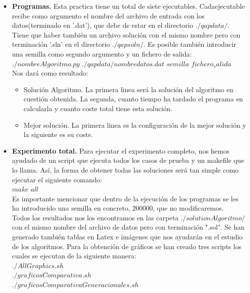 \begin{itemize}
	\item \textbf{Programas.} Esta practica tiene un total de siete ejecutables. Cadaejecutable recibe como argumento el nombre del archivo de entrada con los datos(terminado en '.dat'), que debe de estar en el directorio $./qapdata/$. Tiene que haber también un archivo solución con el mismo nombre pero con terminación '.sln'  en el directorio $./qapsoln/$. Es posible también introducir una semilla como segundo argumento y un fichero de salida:\\
	
	$./nombreAlgoritmo.py$ $./qapdata/nombredatos.dat$ $semilla$ $fichero_salida$\\
	
	Nos dará como resultado:\\
	\begin{itemize}
		\item Solución Algoritmo. La primera linea será la solución del algoritmo en cuestión obtenida. La segunda, cuanto tiempo ha tardado el programa en calcularla y cuanto coste total tiene esta solución.
		\item Mejor solución. La primera linea es la configuración de la mejor solución y la siguiente es su coste.
	\end{itemize}
	
	\item \textbf{Experimento total.} Para ejecutar el experimento completo, nos hemos ayudado de un script que ejecuta todos los casos de prueba y un makefile que lo llama. Así, la forma de obtener todas las soluciones será tan simple como ejecutar el siguiente comando:\\
	
	$make$ $all$\\
	
	Es importante mencionar que dentro de la ejecución de los programas se les ha introducido una semilla en concreto, $200000$, que no modificaremos.\\
	
	Todos los resultados nos los encontramos en las carpeta $./solutionAlgoritmo/$ con el mismo nombre del archivo de datos pero con terminación ".sol". Se han generado también tablas en Latex e imágenes que nos ayudarán en el estudio de los algoritmos. Para la obtención de gráficos se han creado tres scripts los cuales se ejecutan de la siguiente manera:\\
	
	$./AllGraphics.sh$\\
	$./graficosComparativa.sh$\\
	$./graficosComparativaGeneracionales.sh$\\
	
\end{itemize}

